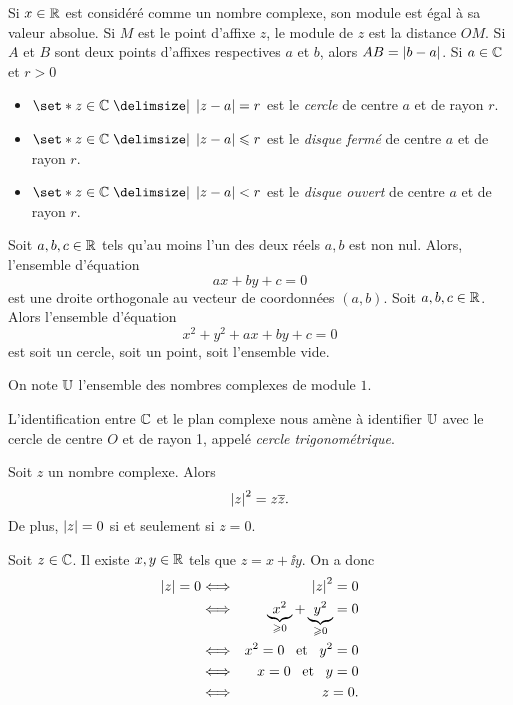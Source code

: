 \documentclass{magnoliaold}
\begin{document}
\begin{remarques}
\remarque Si $x\in\mathbb{R}$ est considéré comme un nombre complexe, son module est égal à sa valeur absolue.
\remarque Si $M$ est le point d'affixe $z$, le module de $z$ est la distance $OM$. Si $A$ et $B$ sont deux points d'affixes respectives $a$ et $b$, alors $AB=\left|b-a\right|$.
\remarque Si $a\in\mathbb{C}$ et $r>0$
  \begin{itemize}
  \item $\enstq{z\in\C}{\abs{z-a}=r}$ est le \emph{cercle} de centre $a$ et de rayon $r$.
  \item $\enstq{z\in\C}{\abs{z-a}\leq r}$ est le \emph{disque fermé} de centre $a$ et de rayon $r$.
  \item $\enstq{z\in\C}{\abs{z-a}<r}$ est le \emph{disque ouvert} de centre $a$ et de rayon $r$.
  \end{itemize}
  \remarque Soit $a,b,c\in\mathbb{R}$ tels qu'au moins l'un des deux réels $a,b$ est non nul.
  Alors, l'ensemble d'équation
  \[ax+by+c=0\]
  est une droite orthogonale au vecteur de coordonnées $(a,b)$.
\remarque Soit $a,b,c\in\mathbb{R}$. Alors l'ensemble d'équation
  \[x^2+y^2+ax+by+c=0\]
  est soit un cercle, soit un point, soit l'ensemble vide.
\end{remarques}

\begin{definition}[utile=-3]
On note $\U$ l'ensemble des nombres complexes de module $1$.
\end{definition}

\begin{remarqueUnique}
\remarque L'identification entre $\mathbb{C}$ et le plan complexe nous amène à identifier $\U$
  avec le cercle de centre $O$ et de rayon 1, appelé \emph{cercle trigonométrique}.
\end{remarqueUnique}

\begin{proposition}
Soit $z$ un nombre complexe. Alors
\[\left|z\right|^2=z \overline{z}.\]
De plus, $\left|z\right|=0$ si et seulement si $z=0$.
\end{proposition}
\begin{preuve}
Soit $z\in\mathbb{C}$. Il existe $x,y\in\mathbb{R}$ tels que $z=x+\ii y$. On a donc
\begin{eqnarray*}
\left|z\right|=0
&\Longleftrightarrow& \left|z\right|^2=0\\
&\Longleftrightarrow& \underbrace{x^2}_{\geqslant 0}+\underbrace{y^2}_{\geqslant 0}=0\\
&\Longleftrightarrow& x^2=0 \quad\!\text{et}\quad\! y^2=0\\
&\Longleftrightarrow& x=0 \quad\!\text{et}\quad\! y=0\\
&\Longleftrightarrow& z=0.
\end{eqnarray*}
\end{preuve}
\end{document}
